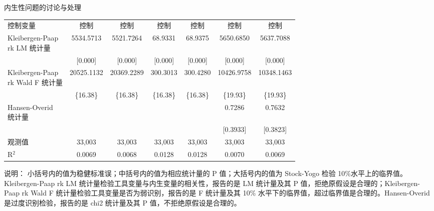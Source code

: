 \documentclass{beamer}
\newcommand{\zhhei}{\CJKfamily{zhhei}}  %
\begin{document}
\begin{frame}{内生性问题的讨论与处理}
{\begin{threeparttable}
\begin{tabular}{lcccccc}
                控制变量 & 控制 & 控制 & 控制 & 控制 & 控制 & 控制 \\
                \makecell[c]{Kleibergen-Paap \\ rk LM 统计量} & 5534.5713 & 5521.7264 & 68.9331 & 68.9375 & 5650.6850 & 5637.7088 \\
                & [0.000] & [0.000] & [0.000] & [0.000] & [0.000] & [0.000] \\
                \makecell[c]{Kleibergen-Paap \\ rk Wald F 统计量} & 20525.1132 & 20369.2289 & 300.3013 & 300.4280 & 10426.9758 & 10348.1463 \\
                & \{16.38\} & \{16.38\} & \{16.38\} & \{16.38\} & \{19.93\} & \{19.93\} \\
                \makecell[c]{Hansen-Overid \\ 统计量} & & & & & 0.7286 & 0.7632 \\
                & & & & & [0.3933] & [0.3823] \\
                观测值 & 33,003 & 33,003 & 33,003 & 33,003 & 33,003 & 33,003 \\
                R$^2$  & 0.0069 & 0.0068 & 0.0128 & 0.0128 & 0.0070 & 0.0069 \\
                \bottomrule
            \end{tabular}
            \begin{tablenotes}
                \item {\zhhei 说明：} 小括号内的值为稳健标准误；中括号内的值为相应统计量的 P 值；大括号内的值为 Stock-Yogo 检验 10\%水平上的临界值。Kleibergen-Paap rk LM 统计量检验工具变量与内生变量的相关性，报告的是 LM 统计量及其 P 值，拒绝原假设是合理的；Kleibergen-Paap rk Wald F 统计量检验工具变量是否为弱识别，报告的是 F 统计量及其 10\% 水平下的临界值，超过临界值是合理的。Hansen-Overid 是过度识别检验，报告的是 chi2 统计量及其 P 值，不拒绝原假设是合理的。
            \end{tablenotes}
        \end{threeparttable}
    }
\end{frame}
\end{document}
